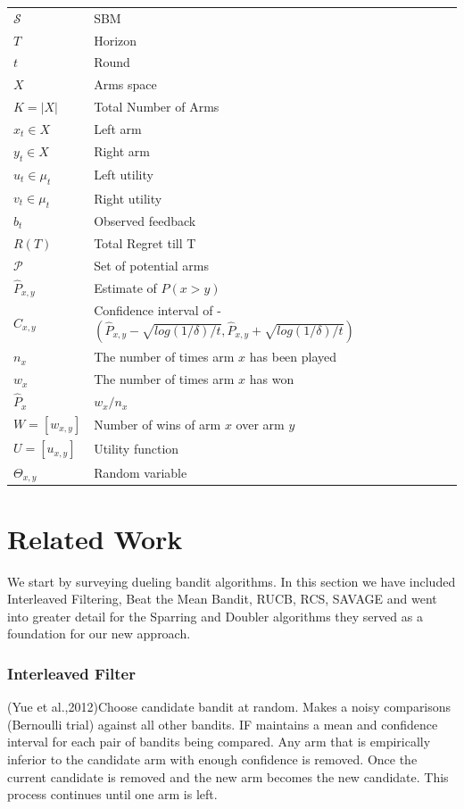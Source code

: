\documentclass{llncs}
\begin{document}
	\begin{table}[h]
		\begin{tabular}{ll}
 			$\mathcal{S}$ & SBM \\
 			$T$ & Horizon \\
 			$t$ &  Round \\
 			$X$ & Arms space \\
 			$K = |X|$ & Total Number of Arms\\
 			$x_t \in X$ & Left arm \\
 			$y_t \in X$ & Right arm \\
 			$u_t \in \mu_t$ & Left utility \\
 			$v_t \in \mu_t$ & Right utility \\
 			$b_t$ & Observed feedback \\
 			$R(T)$ & Total Regret till T\\
 			$\mathcal{P}$ & Set of potential arms \\
 			$\hat{P}_{x, y}$ & Estimate of $P(x>y)$\\
 			$\hat{C}_{x, y}$ &   Confidence interval of - $(\hat{P}_{x, y} - \sqrt{log(1/\delta)/t},\hat{P}_{x, y} +\sqrt{log(1/\delta)/t})$\\
 			$n_x$ &   The number of times arm $x$ has been played\\
 			$w_x$ & The number of times arm $x$ has won\\
 			$\hat{P}_x  $ &  $ w_x / n_x $\\
 			$ W = [w_{x,y}]$ & Number of wins of arm $x$ over arm $y$\\
 			$U = [u_{x,y}]$ &  Utility function\\
 			$\Theta_{x,y}$ &   Random variable
		\end{tabular}
	\end{table}

\section{Related Work}
	We start by surveying dueling bandit algorithms. In this section we have included Interleaved Filtering, Beat the Mean Bandit, RUCB, RCS, SAVAGE and went into greater detail for the Sparring and Doubler algorithms they served as a foundation for our new approach.
	
\subsubsection{Interleaved Filter}
	(Yue et al.,2012)Choose candidate bandit at random. Makes a noisy comparisons (Bernoulli trial) against all other bandits. 
	IF maintains a mean and confidence interval for each pair of bandits being compared. Any arm that is empirically inferior to the candidate arm with  enough confidence is removed.
	Once the current candidate is removed and the new arm becomes the new candidate. This process continues until one arm is left.
	
\end{document}
